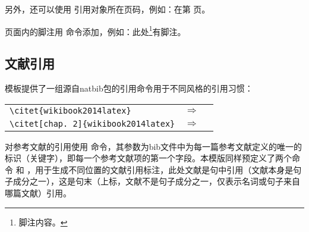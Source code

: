 另外，还可以使用 引用对象所在页码，例如：在第 \pageref{fig:samples:blcfy} 页。

页面内的脚注用 命令添加，例如：此处\footnote{脚注内容。}有脚注。

\subsection{文献引用}\label{sec:samples:cite}
模板提供了一组源自natbib包的引用命令用于不同风格的引用习惯：

{
\renewcommand{\arraystretch}{0.8}
\begin{tabular}{lcl}
\verb|\citet{wikibook2014latex}| & $\Rightarrow$ & \citet{wikibook2014latex} \\
\verb|\citet[chap. 2]{wikibook2014latex}| & $\Rightarrow$ & \citet[chap. 2]{wikibook2014latex} 
\end{tabular}
}

对参考文献的引用使用  命令，其参数为bib文件中为每一篇参考文献定义的唯一的标识（关键字），即每一个参考文献项的第一个字段。本模版同样预定义了两个命令  和 ，用于生成不同位置的文献引用标注，此处文献是句中引用（文献本身是句子成分之一），这是句末（上标，文献不是句子成分之一，仅表示名词或句子来自哪篇文献）引用。


